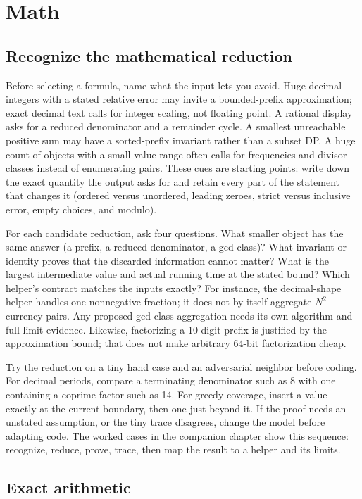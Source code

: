 \chapter{Math}

\section{Recognize the mathematical reduction}
Before selecting a formula, name what the input lets you avoid. Huge decimal
integers with a stated relative error may invite a bounded-prefix approximation;
exact decimal text calls for integer scaling, not floating point. A rational
display asks for a reduced denominator and a remainder cycle. A smallest
unreachable positive sum may have a sorted-prefix invariant rather than a
subset DP. A huge count of objects with a small value range often calls for
frequencies and divisor classes instead of enumerating pairs. These cues are
starting points: write down the exact quantity the output asks for and retain
every part of the statement that changes it (ordered versus unordered,
leading zeroes, strict versus inclusive error, empty choices, and modulo).

For each candidate reduction, ask four questions. What smaller object has the
same answer (a prefix, a reduced denominator, a gcd class)? What invariant or
identity proves that the discarded information cannot matter? What is the
largest intermediate value and actual running time at the stated bound? Which
helper's contract matches the inputs exactly? For instance, the decimal-shape
helper handles one nonnegative fraction; it does not by itself aggregate
$N^2$ currency pairs. Any proposed gcd-class aggregation needs its own
algorithm and full-limit evidence. Likewise, factorizing a
10-digit prefix is justified by the approximation bound; that does not make
arbitrary 64-bit factorization cheap.

Try the reduction on a tiny hand case and an adversarial neighbor before
coding. For decimal periods, compare a terminating denominator such as 8 with
one containing a coprime factor such as 14. For greedy coverage, insert a
value exactly at the current boundary, then one just beyond it. If the proof
needs an unstated assumption, or the tiny trace disagrees, change the model
before adapting code. The worked cases in the companion chapter show this
sequence: recognize, reduce, prove, trace, then map the result to a helper and
its limits.

\section{Exact arithmetic}
